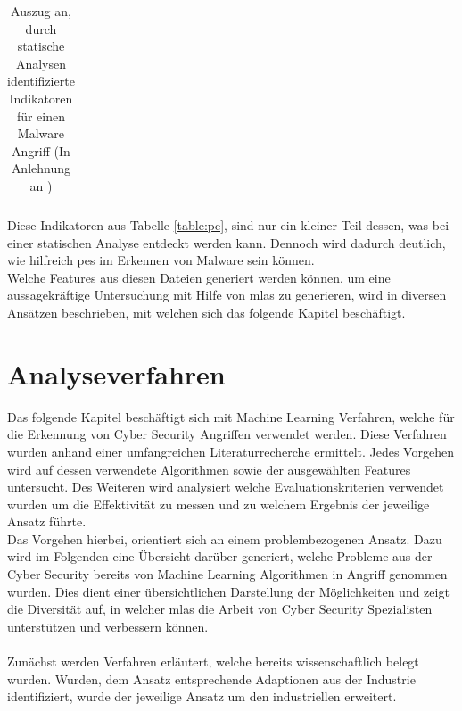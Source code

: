 \documentclass[
    12pt, %
    DIV10,
    ngerman, %
    a4paper, %
    oneside, %
    titlepage, %
    parskip=half, %
    headings=normal, %
    listof=totoc, %
    bibliography=totoc, %
    index=totoc, %
    captions=tableheading, %
    final %
]{scrreprt}
\begin{document}
\begin{table}[H]
\begin{tabular}{lll}
\end{tabular}
\caption{Auszug an, durch statische Analysen identifizierte Indikatoren für einen Malware Angriff (In Anlehnung an \textcite{Sikorski2012})}\label{table:pe}
Diese Indikatoren aus Tabelle \ref{table:pe}, sind nur ein kleiner Teil dessen, was bei einer statischen Analyse entdeckt werden kann. Dennoch wird dadurch deutlich, wie hilfreich \ac{pes} im Erkennen von Malware sein können.\\ 
Welche Features aus diesen Dateien generiert werden können, um eine aussagekräftige Untersuchung mit Hilfe von \ac{mlas} zu generieren, wird in diversen Ansätzen beschrieben, mit welchen sich das folgende Kapitel beschäftigt.
\label{tab:iocs}
\end{table}
\chapter{Analyseverfahren}
\label{sec:ba}
Das folgende Kapitel beschäftigt sich mit Machine Learning Verfahren, welche für die Erkennung von Cyber Security Angriffen verwendet werden. Diese Verfahren wurden anhand einer umfangreichen Literaturrecherche ermittelt. Jedes Vorgehen wird auf dessen verwendete Algorithmen sowie der ausgewählten Features untersucht. Des Weiteren wird analysiert welche Evaluationskriterien verwendet wurden um die Effektivität zu messen und zu welchem Ergebnis der jeweilige Ansatz führte.\\
Das Vorgehen hierbei, orientiert sich an einem problembezogenen Ansatz. Dazu wird im Folgenden eine Übersicht darüber generiert, welche Probleme aus der Cyber Security bereits von Machine Learning Algorithmen in Angriff genommen wurden. Dies dient einer übersichtlichen Darstellung der Möglichkeiten und zeigt die Diversität auf, in welcher \ac{mlas} die Arbeit von Cyber Security Spezialisten unterstützen und verbessern können.\\\\
Zunächst werden Verfahren erläutert, welche bereits wissenschaftlich belegt wurden. Wurden, dem Ansatz entsprechende Adaptionen aus der Industrie identifiziert, wurde der jeweilige Ansatz um den industriellen erweitert.
\end{document}
